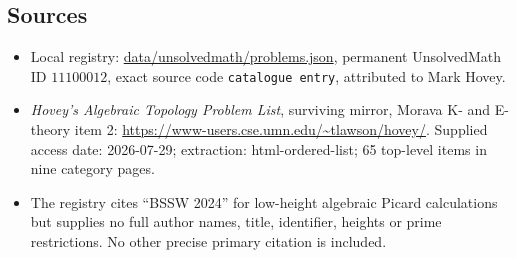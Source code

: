 \documentclass[11pt]{article}
\begin{document}
\subsection{Sources}
\begin{itemize}
\item Local registry: \url{data/unsolvedmath/problems.json}, permanent UnsolvedMath ID $11100012$, exact source code \texttt{catalogue entry}, attributed to Mark Hovey.
\item \emph{Hovey's Algebraic Topology Problem List}, surviving mirror, Morava K- and E-theory item 2: \url{https://www-users.cse.umn.edu/~tlawson/hovey/}. Supplied access date: 2026-07-29; extraction: html-ordered-list; 65 top-level items in nine category pages.
\item The registry cites ``BSSW 2024'' for low-height algebraic Picard calculations but supplies no full author names, title, identifier, heights or prime restrictions. No other precise primary citation is included.
\end{itemize}
\end{document}
